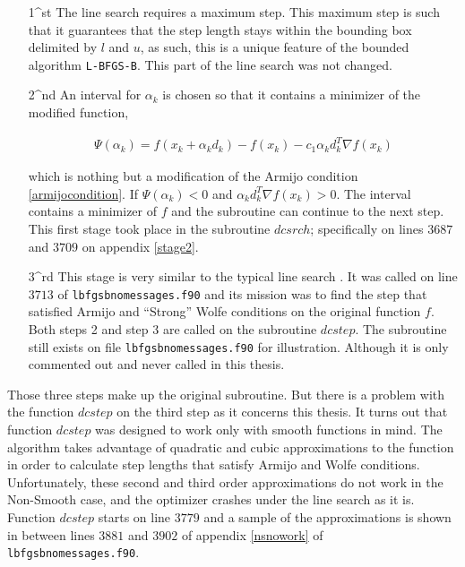 \begin{enumerate}
\item[1^{st}] The line search requires a maximum step. This maximum step is such that it guarantees that the step length stays within the bounding box delimited by $l$ and $u$, as such, this is a unique feature of the bounded algorithm \texttt{L-BFGS-B}. This part of the line search was not changed.

\item[2^{nd}] An interval for $\alpha_k$ is chosen so that it contains a minimizer of the modified function,

\begin{equation} \label{armijomod}
  \begin{aligned}
    \Psi(\alpha_k) = f(x_k + \alpha_k d_k) - f(x_k) - c_1 \alpha_k d_k^T  \nabla f(x_k)
  \end{aligned}
\end{equation} 

 which is nothing but a modification of the Armijo condition \eqref{armijocondition}. If $\Psi(\alpha_k) < 0$ and $\alpha_k d_k^T \nabla f(x_k) > 0$. The interval contains a minimizer of $f$ and the subroutine can continue to the next step. This first stage took place in the subroutine $dcsrch$; specifically on lines $3687$ and $3709$ on appendix \eqref{stage2}.

\item[3^{rd}] This stage is very similar to the typical line search \citep{nocedal}. It was called on line $3713$ of \texttt{lbfgsbnomessages.f90} and its mission was to find the step that satisfied Armijo and ``Strong'' Wolfe conditions on the original function $f$. Both steps 2 and step 3 are called on the subroutine $dcstep$. The subroutine still exists on file \texttt{lbfgsbnomessages.f90} for illustration. Although it is only commented out and never called in this thesis.

\end{enumerate}

Those three steps make up the original subroutine. But there is a problem with the function $dcstep$ on the third step as it concerns this thesis. It turns out that function $dcstep$ was designed to work only with smooth functions in mind. The algorithm takes advantage of quadratic and cubic approximations to the function in order to calculate step lengths that satisfy Armijo and Wolfe conditions. Unfortunately, these second and third order approximations do not work in the Non-Smooth case, and the optimizer crashes under the line search as it is. Function $dcstep$ starts on line $3779$ and a sample of the approximations is shown in between lines $3881$ and $3902$ of appendix \eqref{nsnowork} of \texttt{lbfgsbnomessages.f90}.

